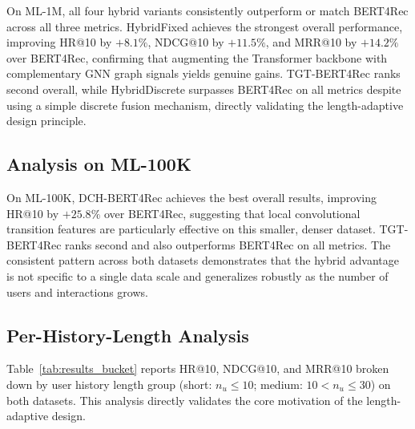 \documentclass[12pt,a4paper]{report}
\begin{document}
On ML-1M, all four hybrid variants consistently outperform or match BERT4Rec
across all three metrics. HybridFixed achieves the strongest overall
performance, improving HR@10 by \(+8.1\%\), NDCG@10 by \(+11.5\%\), and
MRR@10 by \(+14.2\%\) over BERT4Rec, confirming that augmenting the
Transformer backbone with complementary GNN graph signals yields genuine
gains. TGT-BERT4Rec ranks second overall, while HybridDiscrete surpasses
BERT4Rec on all metrics despite using a simple discrete fusion mechanism,
directly validating the length-adaptive design principle.

\subsection*{Analysis on ML-100K}

On ML-100K, DCH-BERT4Rec achieves the best overall results, improving HR@10
by \(+25.8\%\) over BERT4Rec, suggesting that local convolutional transition
features are particularly effective on this smaller, denser dataset.
TGT-BERT4Rec ranks second and also outperforms BERT4Rec on all metrics.
The consistent pattern across both datasets demonstrates that the hybrid
advantage is not specific to a single data scale and generalizes robustly as
the number of users and interactions grows.

\subsection*{Per-History-Length Analysis}

Table~\ref{tab:results_bucket} reports HR@10, NDCG@10, and MRR@10 broken
down by user history length group (short: \(n_u \leq 10\); medium:
\(10 < n_u \leq 30\)) on both datasets. This analysis directly validates the
core motivation of the length-adaptive design.
\end{document}
